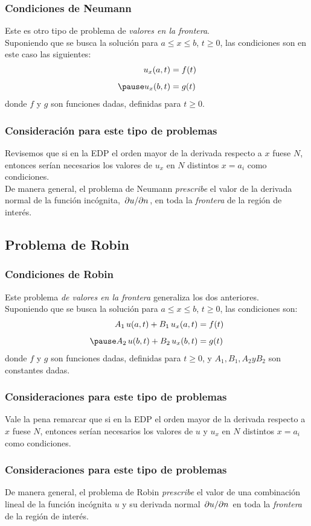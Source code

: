 \documentclass[12pt]{beamer}
\begin{document}
\begin{frame}
\frametitle{Condiciones de Neumann}
Este es otro tipo de problema de \emph{valores en la frontera}.
\\
\bigskip
\pause
 Suponiendo que se busca la solución para $a \leq x \leq b$, $t \geq 0$, las condiciones son en este caso las siguientes:
\begin{eqnarray}
u_{x}(a, t) &= f(t) \label{eq:ecuacion_Z01_11} \\[0.5em] \pause
u_{x}(b, t) &= g(t) \label{eq:ecuacion_Z01_12}
\end{eqnarray}
donde $f$ y $g$ son funciones dadas, definidas para $t \geq 0$.
\end{frame}
\begin{frame}
\frametitle{Consideración para este tipo de problemas}
Revisemos que si en la EDP el orden mayor de la derivada respecto a $x$ fuese $N$, entonces serían necesarios los valores de $u_{x}$ en $N$ distintos $x = a_{i}$ como condiciones.
\\
\bigskip
\pause
De manera general, el problema de Neumann \emph{prescribe} el valor de la derivada normal de la función incógnita, $\pdv*{u}{n}$, en toda la \emph{frontera} de la región de interés.
\end{frame}

\subsection{Problema de Robin}

\begin{frame}
\frametitle{Condiciones de Robin}
Este problema \emph{de valores en la frontera} generaliza los dos anteriores.
\\
\bigskip
\pause
Suponiendo que se busca la solución para $a \leq x \leq b$, $t \geq 0$, las condiciones son:
\pause
\begin{eqnarray}
A_{1} \, u(a, t) + B_{1} \, u_{x}(a, t) &= f(t) \label{eq:ecuacion_Z01_13} \\[0.5em] \pause
A_{2} \, u(b, t) + B_{2} \, u_{x}(b, t) &= g(t) \label{eq:ecuacion_Z01_14}
\end{eqnarray}
donde $f$ y $g$ son funciones dadas, definidas para $t \geq 0$, y $A_{1}, B_{1}, A_{2} y B_{2}$ son constantes dadas.
\end{frame}
\begin{frame}
\frametitle{Consideraciones para este tipo de problemas}
Vale la pena remarcar que si en la EDP el orden mayor de la derivada respecto a $x$ fuese $N$, entonces serían necesarios los valores de $u$ y $u_{x}$ en $N$ distintos $x = a_{i}$ como condiciones.
\end{frame}
\begin{frame}
\frametitle{Consideraciones para este tipo de problemas}
De manera general, el problema de Robin \emph{prescribe} el valor de una combinación lineal de la función incógnita $u$ y su derivada normal $\pdv*{u}{n}$ en toda la \emph{frontera} de la región de interés.
\end{frame}
\end{document}
